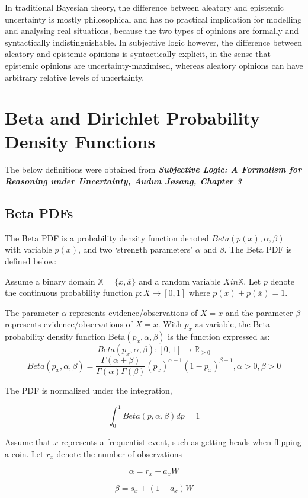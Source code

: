 \documentclass[UTF8]{article}
\newcommand{\mycite}[1]{\textbf{\textit{#1}}}
\begin{document}
In traditional Bayesian theory, the difference between aleatory and epistemic uncertainty is mostly philosophical and has no practical implication for modelling and analysing real situations, because the two types of opinions are formally and syntactically indistinguishable. In subjective logic however, the difference between aleatory and epistemic opinions is syntactically explicit, in the sense that epistemic opinions are uncertainty-maximised, whereas aleatory opinions can have arbitrary relative levels of uncertainty.

\section{Beta and Dirichlet Probability Density Functions}
The below definitions were obtained from \mycite{Subjective Logic: A Formalism for Reasoning under Uncertainty, Audun Jøsang, Chapter 3}
\subsection{Beta PDFs}
The Beta PDF is a probability density function denoted $Beta(p(x),\alpha,\beta)$ with variable $p(x)$, and two ‘strength parameters’ $\alpha$ and $\beta$. The Beta PDF is defined below:

Assume a binary domain $\mathbb{X} = \{x, \overline{x}\}$ and a random variable $X in \mathbb{X}$. Let $p$ denote the continuous probability function $p : X \rightarrow [0,1]$ where $p(x) + p(\overline{x}) = 1$.

The parameter $\alpha$ represents evidence/observations of $X = x$ and the parameter $\beta$ represents evidence/observations of $X = \overline{x}$. With $p_x$ as variable, the Beta probability density function Beta$(p_x, \alpha, \beta)$ is the function expressed as:
$$ 
    Beta(p_x, \alpha, \beta) : [0, 1] \rightarrow \mathbb{R}_{\geq 0}
$$
$$
    Beta(p_x, \alpha, \beta) = \frac{\Gamma(\alpha + \beta)}{\Gamma(\alpha) \Gamma(\beta)} \left(p_x\right)^{\alpha - 1}\left(1 - p_x\right)^{\beta - 1}, \alpha > 0, \beta > 0
$$

The PDF is normalized under the integration,

$$\int_{0}^{1} Beta(p, \alpha, \beta)dp = 1$$

Assume that $x$ represents a frequentist event, such as getting heads when flipping a coin. Let $r_x$ denote the number of observations 

$$\alpha = r_x +  a_xW$$

$$\beta = s_x + (1 - a_x)W$$    
\end{document}

